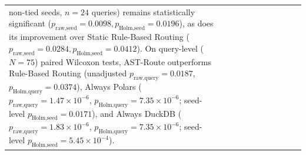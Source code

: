 \documentclass[10pt,a4paper]{article}
\newenvironment{fitasttable}{%
  \begin{lrbox}{\asttblbox}%
}{%
  \end{lrbox}%
  \sbox{\asttblboxB}{%
    \ifdim\wd\asttblbox>0.96\textwidth
      \resizebox{0.96\textwidth}{!}{\usebox{\asttblbox}}%
    \else
      \usebox{\asttblbox}%
    \fi
  }%
  \ifdim\ht\asttblboxB>0.72\textheight
    \resizebox{!}{0.72\textheight}{\usebox{\asttblboxB}}%
  \else
    \usebox{\asttblboxB}%
  \fi
}
\begin{document}
\begin{table}[!htbp]
\begin{fitasttable}
\begin{tabular}{@{}lcccccccccc@{}}
non-tied seeds, $n=24$ queries) remains statistically significant ($p_{\text{raw,seed}}=0.0098, p_{\text{Holm,seed}}=0.0196$), as does its improvement over Static Rule-Based Routing ($p_{\text{raw,seed}}=0.0284, p_{\text{Holm,seed}}=0.0412$). On query-level ($N=75$) paired Wilcoxon tests, AST-Route outperforms Rule-Based Routing (unadjusted $p_{\text{raw,query}}=0.0187$, $p_{\text{Holm,query}}=0.0374$), Always Polars ($p_{\text{raw,query}}=1.47\times 10^{-6}$, $p_{\text{Holm,query}}=7.35\times 10^{-6}$; seed-level $p_{\text{Holm,seed}}=0.0171$), and Always DuckDB ($p_{\text{raw,query}}=1.83\times 10^{-6}$, $p_{\text{Holm,query}}=7.35\times 10^{-6}$; seed-level $p_{\text{Holm,seed}}=5.45\times 10^{-4}$).}\\
\end{tabular}
\end{fitasttable}
\end{table}
\end{document}
